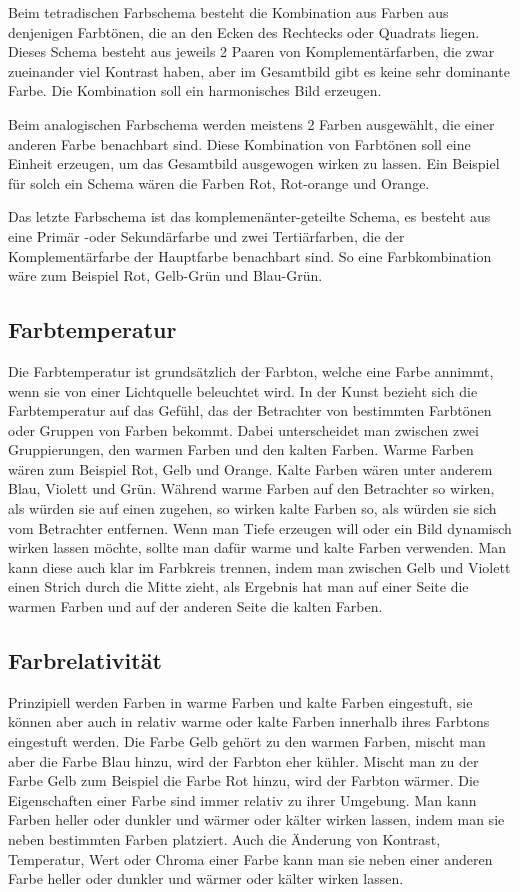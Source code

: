 Beim tetradischen Farbschema besteht die Kombination aus Farben aus denjenigen Farbtönen, die an den Ecken des Rechtecks oder Quadrats liegen. Dieses Schema besteht aus jeweils 2 Paaren von Komplementärfarben, die zwar zueinander viel Kontrast haben, aber im Gesamtbild gibt es keine sehr dominante Farbe. Die Kombination soll ein harmonisches Bild erzeugen.

Beim analogischen Farbschema werden meistens 2 Farben ausgewählt, die einer anderen Farbe benachbart sind. Diese Kombination von Farbtönen soll eine Einheit erzeugen, um das Gesamtbild ausgewogen wirken zu lassen. Ein Beispiel für solch ein Schema wären die Farben Rot, Rot-orange und Orange.

Das letzte Farbschema ist das komplemenänter-geteilte Schema, es besteht aus eine Primär -oder Sekundärfarbe und zwei Tertiärfarben, die der Komplementärfarbe der Hauptfarbe benachbart sind. So eine Farbkombination wäre zum Beispiel Rot, Gelb-Grün und Blau-Grün.

\subsection{Farbtemperatur}
Die Farbtemperatur ist grundsätzlich der Farbton, welche eine Farbe annimmt, wenn sie von einer Lichtquelle beleuchtet wird. In der Kunst bezieht sich die Farbtemperatur auf das Gefühl, das der Betrachter von bestimmten Farbtönen oder Gruppen von Farben bekommt. Dabei unterscheidet man zwischen zwei Gruppierungen, den warmen Farben und den kalten Farben. Warme Farben wären zum Beispiel Rot, Gelb und Orange. Kalte Farben wären unter anderem Blau, Violett und Grün. Während warme Farben auf den Betrachter so wirken, als würden sie auf einen zugehen, so wirken kalte Farben so, als würden sie sich vom Betrachter entfernen. Wenn man Tiefe erzeugen will oder ein Bild dynamisch wirken lassen möchte, sollte man dafür warme und kalte Farben verwenden. Man kann diese auch klar im Farbkreis trennen, indem man zwischen Gelb und Violett einen Strich durch die Mitte zieht, als Ergebnis hat man auf einer Seite die warmen Farben und auf der anderen Seite die kalten Farben.

\subsection{Farbrelativität}
Prinzipiell werden Farben in warme Farben und kalte Farben eingestuft, sie können aber auch in relativ warme oder kalte Farben innerhalb ihres Farbtons eingestuft werden. Die Farbe Gelb gehört zu den warmen Farben, mischt man aber die Farbe Blau hinzu, wird der Farbton eher kühler. Mischt man zu der Farbe Gelb zum Beispiel die Farbe Rot hinzu, wird der Farbton wärmer. Die Eigenschaften einer Farbe sind immer relativ zu ihrer Umgebung. Man kann Farben heller oder dunkler und wärmer oder kälter wirken lassen, indem man sie neben bestimmten Farben platziert. Auch die Änderung von Kontrast, Temperatur, Wert oder Chroma einer Farbe kann man sie neben einer anderen Farbe heller oder dunkler und wärmer oder kälter wirken lassen. 

